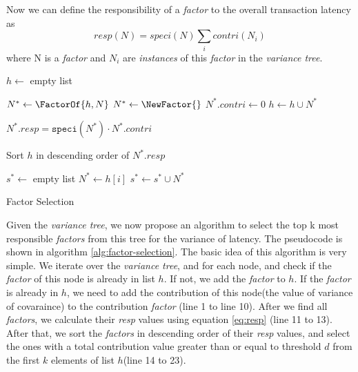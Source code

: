 Now we can define the responsibility of a \textit{factor} to the overall
transaction latency as
\begin{equation}
resp(N) =  speci(N)\sum_{i}contri(N_i)
\label{eq:resp}
\end{equation}
where N is a \textit{factor} and $N_i$ are \textit{instances} of this
\textit{factor} in the \textit{variance tree}.

\begin{algorithm}[t]
    \SetAlgoLined
    
        
    \BlankLine
        
    $h \gets $ empty list\;
    \BlankLine    
    
     {
        $N^* \gets \FactorOf{h, N}$\;
         {
            $N^* \gets \NewFactor{}$\;
            $N^*.contri \gets 0$\;
            $h \gets h \cup N^*$\;
        }
    }
    \BlankLine    
    
     {
        $N^*.resp = \texttt{speci}(N^*) \cdot N^*.contri$\;
    }
    \BlankLine
    
    Sort $h$ in descending order of $N^*.resp$\;
    \BlankLine
    
    $s^* \gets$ empty list\;
     {
        $N^* \gets h[i]$\;
         {
            $s^* \gets s^* \cup N^*$\;
        }
    }
    
    \;
    
\caption{Factor Selection}
\label{alg:factor-selection}
\end{algorithm}

Given the \textit{variance tree}, we now propose an algorithm to select the top
k most responsible \textit{factors} from this tree for the variance of latency.
The pseudocode is shown in algorithm \ref{alg:factor-selection}. The basic
idea of this algorithm is very simple. We iterate over the \textit{variance 
tree}, and for each node, and check if the \textit{factor} of this node is 
already in list $h$. If not, we add the \textit{factor} to $h$. If the
\textit{factor} is already in $h$, we need to add the contribution of this
node(the value of variance of covaraince) to the contribution \textit{factor}
(line 1 to line 10). After we find all \textit{factors}, we calculate their
\textit{resp} values using equation \ref{eq:resp} (line 11 to 13). After that,
we sort the \textit{factors} in descending order of their \textit{resp} values,
and select the ones with a total contribution value greater than or equal to
threshold $d$ from the first $k$ elements of list $h$(line 14 to 23).

